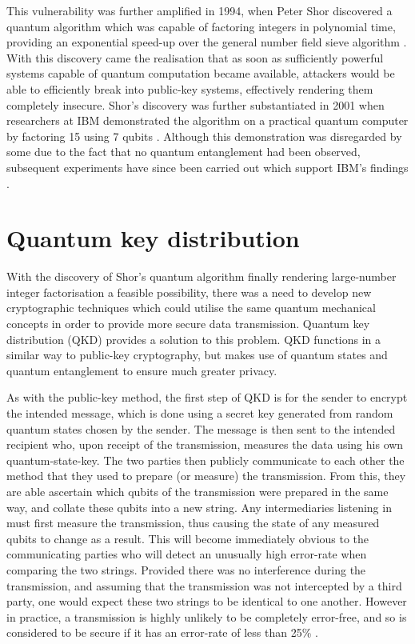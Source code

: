 \documentclass[runningheads,a4paper]{llncs}
\begin{document}
This vulnerability was further amplified in 1994, when Peter Shor discovered a quantum algorithm which was capable of factoring integers in polynomial time, providing an exponential speed-up over the general number field sieve algorithm \cite{Shor:1994fk}. With this discovery came the realisation that as soon as sufficiently powerful systems capable of quantum computation became available, attackers would be able to efficiently break into public-key systems, effectively rendering them completely insecure. Shor's discovery was further substantiated in 2001 when researchers at IBM demonstrated the algorithm on a practical quantum computer by factoring 15 using 7 qubits \cite{Vandersypen:2001fk}. Although this demonstration was disregarded by some due to the fact that no quantum entanglement had been observed, subsequent experiments have since been carried out which support IBM's findings \cite{Lu:2007uq}.

\section{Quantum key distribution}

With the discovery of Shor's quantum algorithm finally rendering large-number integer factorisation a feasible possibility, there was a need to develop new cryptographic techniques which could utilise the same quantum mechanical concepts in order to provide more secure data transmission. Quantum key distribution (QKD) provides a solution to this problem. QKD functions in a similar way to public-key cryptography, but makes use of quantum states and quantum entanglement to ensure much greater privacy.

As with the public-key method, the first step of QKD is for the sender to encrypt the intended message, which is done using a secret key generated from random quantum states chosen by the sender. The message is then sent to the intended recipient who, upon receipt of the transmission, measures the data using his own quantum-state-key. The two parties then publicly communicate to each other the method that they used to prepare (or measure) the transmission. From this, they are able ascertain which qubits of the transmission were prepared in the same way, and collate these qubits into a new string. Any intermediaries listening in must first measure the transmission, thus causing the state of any measured qubits to change as a result. This will become immediately obvious to the communicating parties who will detect an unusually high error-rate when comparing the two strings. Provided there was no interference during the transmission, and assuming that the transmission was not intercepted by a third party, one would expect these two strings to be identical to one another. However in practice, a transmission is highly unlikely to be completely error-free, and so is considered to be secure if it has an error-rate of less than 25\% \cite{Steane:1997zr}.
\end{document}
